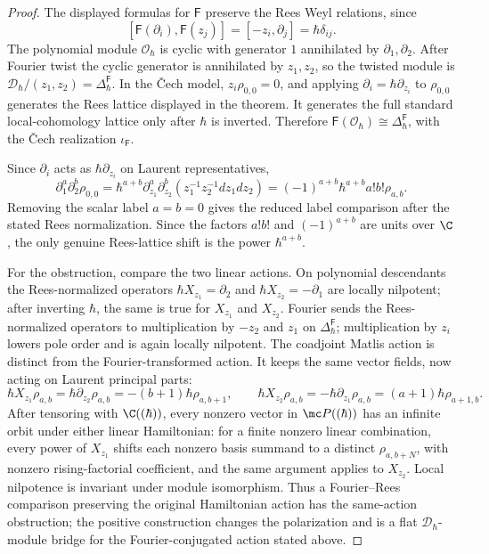 \begin{proof}
  The displayed formulas for \(\mathsf F\) preserve the Rees Weyl
  relations, since
  \[
    [\mathsf F(\partial_i),\mathsf F(z_j)]
      =[-z_i,\partial_j]=\hbar\delta_{ij}.
  \]
  The polynomial module \(\mathcal O_\hbar\) is cyclic with generator
  \(1\) annihilated by \(\partial_1,\partial_2\).  After Fourier twist
  the cyclic generator is annihilated by \(z_1,z_2\), so the twisted
  module is \(\mathcal D_\hbar/(z_1,z_2)=\Delta^{\mathsf F}_\hbar\).
  In the \v{C}ech model, \(z_i\rho_{0,0}=0\), and applying
  \(\partial_i=\hbar\partial_{z_i}\) to \(\rho_{0,0}\) generates the
  Rees lattice displayed in the theorem.  It generates the full
  standard local-cohomology lattice only after \(\hbar\) is inverted.
  Therefore
  \(\mathsf F(\mathcal O_\hbar)\cong\Delta^{\mathsf F}_\hbar\), with the
  \v{C}ech realization \(\iota_{\mathsf F}\).

  Since \(\partial_i\) acts as \(\hbar\partial_{z_i}\) on Laurent
  representatives,
  \[
    \partial_1^a\partial_2^b\rho_{0,0}
    =
    \hbar^{a+b}
    \partial_{z_1}^a\partial_{z_2}^b
      (z_1^{-1}z_2^{-1}dz_1dz_2)
    =
    (-1)^{a+b}\hbar^{a+b}a!b!\rho_{a,b}.
  \]
  Removing the scalar label \(a=b=0\) gives the reduced label comparison
  after the stated Rees normalization.  Since the factors \(a!b!\) and
  \((-1)^{a+b}\) are units over \(\C\), the only genuine Rees-lattice
  shift is the power \(\hbar^{a+b}\).

  For the obstruction, compare the two linear actions.  On polynomial
  descendants the Rees-normalized operators
  \(\hbar X_{z_1}=\partial_2\) and
  \(\hbar X_{z_2}=-\partial_1\) are locally nilpotent; after inverting
  \(\hbar\), the same is true for \(X_{z_1}\) and \(X_{z_2}\).  Fourier
  sends the Rees-normalized operators to multiplication by \(-z_2\) and
  \(z_1\) on \(\Delta^{\mathsf F}_\hbar\); multiplication by \(z_i\)
  lowers pole order and is again locally nilpotent.  The coadjoint
  Matlis action is distinct from the Fourier-transformed action.  It keeps the
  same vector fields, now acting on Laurent principal parts:
  \[
    \hbar X_{z_1}\rho_{a,b}
      =\hbar\partial_{z_2}\rho_{a,b}
      =-(b+1)\hbar\rho_{a,b+1},\qquad
    \hbar X_{z_2}\rho_{a,b}
      =-\hbar\partial_{z_1}\rho_{a,b}
      =(a+1)\hbar\rho_{a+1,b}.
  \]
  After tensoring with \(\C((\hbar))\), every nonzero vector in
  \(\mc P((\hbar))\) has an infinite orbit under either linear
  Hamiltonian: for a finite nonzero linear combination, every power of
  \(X_{z_1}\) shifts each nonzero basis summand to a distinct
  \(\rho_{a,b+N}\), with nonzero rising-factorial coefficient, and the
  same argument applies to \(X_{z_2}\).  Local nilpotence is invariant
  under module isomorphism.
  Thus a Fourier--Rees comparison preserving the original Hamiltonian
  action has the same-action obstruction; the positive construction
  changes the polarization and is a flat \( \mathcal D_\hbar \)-module
  bridge for the Fourier-conjugated action stated above.
\end{proof}

